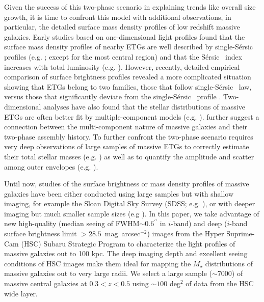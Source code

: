 \documentclass[a4paper,fleqn,usenatbib]{mnras}
\def\arcsec{{\prime\prime}}
\def\sb{mag~arcsec$^{-2}$}
\def\ser{{S\'{e}rsic\ }}
\def\mstar{{$M_{\star}$}}
\begin{document}
    Given the success of this two-phase scenario in explaining trends like overall size 
    growth, it is time to confront this model with additional observations, 
    in particular, the detailed surface mass density profiles of low redshift massive 
    galaxies. 
    Early studies based on one-dimensional light profiles found that the surface 
    mass density profiles of nearby ETGs are well described by single-\ser{} profiles 
    (e.g. \citealt{Kormendy2009}; except for the most central region) and that the 
    \ser{} index increases with total luminosity 
    (e.g. \citealt{Graham2013}). 
    However, recently, detailed empirical comparison of surface brightness profiles 
    revealed a more complicated situation showing that ETGs belong to two families, 
    those that follow single-\ser{} law, versus those that significantly deviate from 
    the single-\ser{} profile \citep{Schombert2015}.  
    Two-dimensional analyses have also found that the stellar distributions of massive 
    ETGs are often better fit by multiple-component models 
    (e.g. \citealt{Huang2013a, Oh2017}).  
    \citet{Huang2013b} further suggest a connection between the multi-component 
    nature of massive galaxies and their two-phase assembly history. 
    To further confront the two-phase scenario requires very deep observations of 
    large samples of massive ETGs to correctly estimate their total stellar masses
    (e.g. \citealt{Bernardi2013, DSouza2014}) as well as to quantify the amplitude and 
    scatter among outer envelopes (e.g. \citealt{Capaccioli2015, Iodice2016, 
    Iodice2017}).
    
    Until now, studies of the surface brightness or mass density profiles of massive 
    galaxies have been either conducted using large samples but with shallow imaging, 
    for example the Sloan Digital Sky Survey (SDSS; e.g. \citealt{SDSSDR7, SDSSDR12}), 
    or with deeper imaging but much smaller sample sizes (e.g \citealt{Gonzalez2005, 
    Capaccioli2015}). 
    In this paper, we take advantage of new high-quality (median seeing of
    FWHM${\sim} 0.6^{\arcsec}$ in $i$-band) and deep ($i$-band surface brightness 
    limit $> 28.5$~\sb) images from the Hyper Suprime-Cam (HSC) Subaru Strategic 
    Program \citep[SSP,][]{HSCDR1} to characterize the light profiles of massive 
    galaxies out to 100 kpc. 
    The deep imaging depth and excellent seeing conditions of HSC images make them 
    ideal for mapping the \mstar{} distributions of massive galaxies out to very 
    large radii. 
    We select a large sample (${\sim} 7000$) of massive central galaxies 
    at $0.3 < z < 0.5$ using ${\sim} 100$ deg$^2$ of data from the HSC wide layer. 
    
\end{document}
